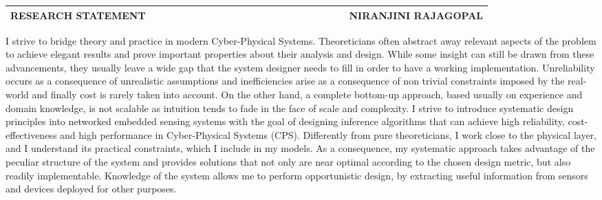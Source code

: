 \documentclass[10pt]{article}
\date{}
\begin{document}


\begin{table}
\color{blue}
\begin{tabular*}{\textwidth}{l r}
\large\textbf{RESEARCH STATEMENT} & 
\hfill \ \ \ \ \ \ \ \ \ \ \ \ \ \ \ \ \ \ \ \
\ \ \ \ \ \ \ \ \ \ \ \ \ \ \
\large\textbf{NIRANJINI RAJAGOPAL}\\
\hline
\end{tabular*}

\end{table}
 

I strive to bridge theory and practice in modern Cyber-Physical Systems. %
Theoreticians often abstract away relevant aspects of the problem to achieve elegant results and prove important properties about their analysis and design. While some insight can still be drawn from these advancements, they usually leave a wide gap that the system designer needs to fill in order to have a working implementation. %
Unreliability occurs as a consequence of unrealistic assumptions and inefficiencies arise as a consequence of non trivial constraints imposed by the real-world and finally cost is rarely taken into account. 
On the other hand, a complete bottom-up approach, based usually on experience and domain knowledge, is not scalable as intuition tends to fade in the face of scale and complexity. I strive to introduce systematic design principles into networked embedded sensing systems with the goal of designing inference algorithms that can achieve high reliability, cost-effectiveness and high performance in Cyber-Physical Systems (CPS). Differently from pure theoreticians, I work close to the physical layer, and I understand its practical constraints, which I include in my models. As a consequence, my systematic approach takes advantage of the peculiar structure of the system and provides solutions that not only are near optimal according to the chosen design metric, but also readily implementable. Knowledge of the system allows me to perform opportunistic design, by extracting useful information from sensors and devices deployed for other purposes. \\
\end{document}
